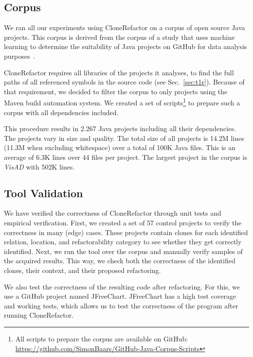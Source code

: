 \documentclass[sigconf,review, table]{acmart}
\begin{document}
\subsection{Corpus}
We ran all our experiments using CloneRefactor on a corpus of open source Java projects. This corpus is derived from the corpus of a study that uses machine learning to determine the suitability of Java projects on GitHub for data analysis purposes~\cite{githubCorpus2013}.

CloneRefactor requires all libraries of the projects it analyses, to find the full paths of all referenced symbols in the source code (see Sec.~\ref{sec:t1r}). Because of that requirement, we decided to filter the corpus to only projects using the Maven build automation system. We created a set of scripts\footnote{All scripts to prepare the corpus are available on GitHub: \url{https://github.com/SimonBaars/GitHub-Java-Corpus-Scripts}} to prepare such a corpus with all dependencies included.

This procedure results in 2.267 Java projects including all their dependencies. The projects vary in size and quality. The total size of all projects is 14.2M lines (11.3M when excluding whitespace) over a total of 100K Java files. This is an average of 6.3K lines over 44 files per project. The largest project in the corpus is \textit{VisAD} with 502K lines.

\subsection{Tool Validation}
We have verified the correctness of CloneRefactor through unit tests and empirical verification. First, we created a set of 57 control projects to verify the correctness in many (edge) cases. These projects contain clones for each identified relation, location, and refactorability category to see whether they get correctly identified. Next, we run the tool over the corpus and manually verify samples of the acquired results. This way, we check both the correctness of the identified clones, their context, and their proposed refactoring.

We also test the correctness of the resulting code after refactoring. For this, we use a GitHub project named JFreeChart. JFreeChart has a high test coverage and working tests, which allows us to test the correctness of the program after running CloneRefactor.
\end{document}
